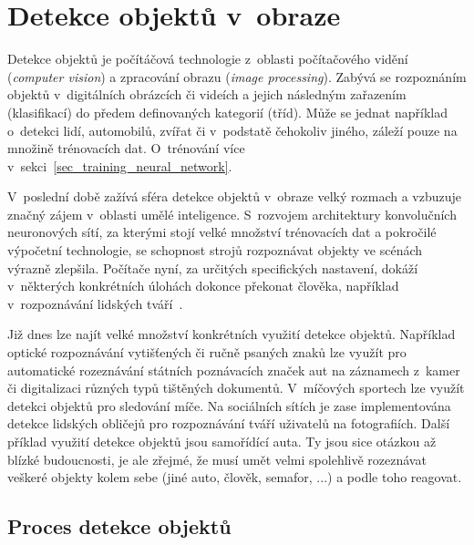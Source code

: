 
\chapter{Detekce objektů v~obraze}
\label{chap_2}

Detekce objektů je počítáčová technologie z~oblasti počítačového vidění (\textit{computer vision}) a zpracování obrazu (\textit{image processing}). Zabývá se rozpoznáním objektů v~digitálních obrázcích či videích a jejich následným zařazením (klasifikací) do předem definovaných kategorií (tříd). Může se jednat například o~detekci lidí, automobilů, zvířat či v~podstatě čehokoliv jiného, záleží pouze na množině trénovacích dat. O~trénování více v~sekci~\ref{sec_training_neural_network}.

V~poslední době zažívá sféra detekce objektů v~obraze velký rozmach a vzbuzuje značný zájem v~oblasti umělé inteligence. S~rozvojem architektury konvolučních neuronových sítí, za kterými stojí velké množství trénovacích dat a pokročilé výpočetní technologie, se schopnost strojů rozpoznávat objekty ve scénách výrazně zlepšila. Počítače nyní, za určitých specifických nastavení, dokáží v~některých konkrétních úlohách dokonce překonat člověka, například v~rozpoznávání lidských tváří~\cite{paperSurpassingHuman}.

Již dnes lze najít velké množství konkrétních využití detekce objektů. Například optické rozpoznávání vytišťených či ručně psaných znaků lze využít pro automatické rozeznávání státních poznávacích značek aut na záznamech z~kamer či digitalizaci různých typů tištěných dokumentů. V~míčových sportech lze využít detekci objektů pro sledování míče. Na sociálních sítích je zase implementována detekce lidských obličejů pro rozpoznávání tváří uživatelů na fotografiích. Další příklad využití detekce objektů jsou samořídící auta. Ty jsou sice otázkou až blízké budoucnosti, je ale zřejmé, že musí umět velmi spolehlivě rozeznávat veškeré objekty kolem sebe (jiné auto, člověk, semafor, ...) a podle toho reagovat.


\section{Proces detekce objektů}
\label{sec_process_object_detection}

